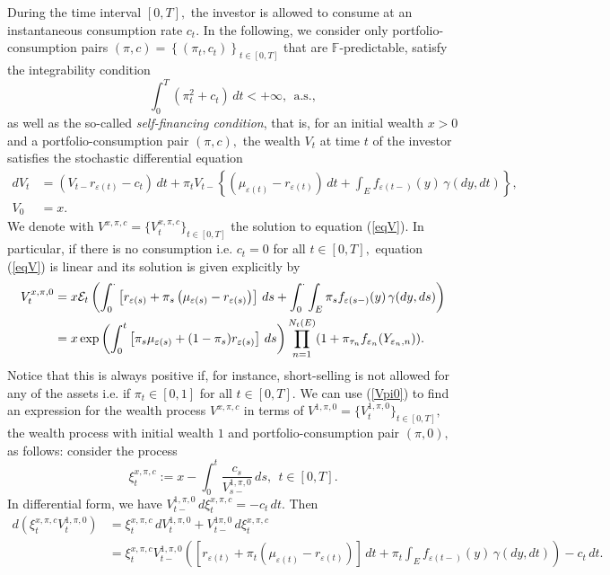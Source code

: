 \documentclass[11pt]{article}
\theoremstyle{plain}
\theoremstyle{definition}
\numberwithin{equation}{section}
\newcommand{\set}[1]{\left\{#1\right\}}
\newcommand{\eps}{\varepsilon}
\newcommand{\Fil}{\mathds{F}}
\begin{document}
During the time interval $[0,T],$ the investor is allowed to consume at an instantaneous consumption rate $c_t.$ In the following, we consider only portfolio-consumption pairs $(\pi,c)=\set{(\pi_t,c_t)}_{t\in [0,T]}$ that are $\Fil$-predictable, satisfy the integrability condition
\[
\int_0^T(\pi_t^2+c_t)\,dt<+\infty, \ \ \mbox{a.s.},
\]
as well as the so-called \emph{self-financing condition}, that is, for an initial wealth $x>0$ and a portfolio-consumption pair $(\pi,c),$ the wealth $V_t$ at time $t$ of the investor satisfies the stochastic differential equation
\begin{equation}\label{eqV}
\begin{split}
dV_t&=(V_{t-}r_{\eps(t)}-c_t)\,dt+\pi_tV_{t-}\left\{(\mu_{\eps(t)}-r_{\eps(t)})\,dt+\int_{E} f_{\eps(t-)}(y)\,\gamma(dy,dt)\right\},\\
V_0&=x.
\end{split}
\end{equation}
We denote with $V^{x,\pi,c}=\{V_t^{x,\pi,c}\}_{t\in [0,T]}$  the solution to equation (\ref{eqV}). In particular, if there is no consumption i.e. $c_t =0$ for all $t\in[0,T],$ equation (\ref{eqV}) is linear and its solution is given explicitly by
\begin{align}
V_t^{x,\pi,0}&=x\mathcal{E}_t\left(\int_0^\cdot \left[r_{\eps(s)}+\pi_s\left(\mu_{\eps(s)}-r_{\eps(s)}\right)\right]\,ds+\int_0^\cdot\int_E\pi_s f_{\eps(s-)}(y)\,\gamma(dy,ds)\right)\notag\\
&=x\exp\left(\int_0^t\left[\pi_s\mu_{\eps(s)}
+(1-\pi_s)r_{\eps(s)}\right]\,ds\right)\prod_{n=1}^{N_t(E)}(1+\pi_{\tau_n}f_{\eps_n}(Y_{\eps_n,n})).\label{Vpi0}
\end{align}
Notice that this is always positive if, for instance, short-selling is not allowed for any of the assets i.e. if $\pi_t\in [0,1]$ for all $t\in[0,T].$
We can use (\ref{Vpi0}) to find an expression for the wealth process $V^{x,\pi,c}$ in terms of $V^{1,\pi,0}=\{V_t^{1,\pi,0}\}_{t\in [0,T]},$ the wealth process with initial wealth $1$ and portfolio-consumption pair $(\pi,0),$ as follows:  consider the process
\[
\xi_t^{x,\pi,c}:=x-\int_0^t\frac{c_s}{V_{s-}^{1,\pi,0}}\,ds, \ \ t\in [0,T].
\]
In differential form, we have $V_{t-}^{1,\pi,0}\,d\xi_t^{{x,\pi,c}}=-c_t\,dt.$ Then
\begin{align*}
d\left(\xi_t^{{x,\pi,c}}V_t^{1,\pi,0}\right)&=\xi_t^{{x,\pi,c}}\,dV_t^{1,\pi,0}+V_{t-}^{1\pi,0}\,d\xi_t^{{x,\pi,c}}\\
&=\xi_t^{{x,\pi,c}}V_{t-}^{1,\pi,0}\left(\left[r_{\eps(t)}+\pi_t\left(\mu_{\eps(t)}-r_{\eps(t)}\right)\right]\,dt+\pi_t\int_{E} f_{\eps(t-)}(y)\,\gamma(dy,dt)\right)-c_t\,dt.
\end{align*}
\end{document}
